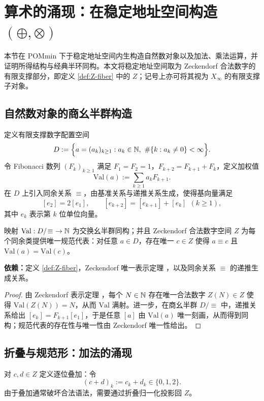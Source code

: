 \section{算术的涌现：在稳定地址空间构造 \texorpdfstring{$(\oplus,\otimes)$}{(oplus, otimes)}}\label{sec:emergent-arithmetic}

本节在 POMmin 下于稳定地址空间内生构造自然数对象以及加法、乘法运算，并证明所得结构与经典半环同构。本文将稳定地址空间取为 Zeckendorf 合法数字的有限支撑部分，即定义 \ref{def:Z-fiber} 中的 $Z$；记号上亦可将其视为 $X_\infty$ 的有限支撑子对象。

\subsection{自然数对象的商幺半群构造}
定义有限支撑数字配置空间
$$
D:=\Bigl\{a=(a_k)_{k\ge 1}: a_k\in\NN,\ \#\{k:a_k\neq 0\}<\infty\Bigr\}.
$$
令 Fibonacci 数列 $(F_k)_{k\ge 1}$ 满足 $F_1=F_2=1$，$F_{k+2}=F_{k+1}+F_k$，定义加权值
$$
\mathrm{Val}(a):=\sum_{k\ge 1} a_k F_{k+1}.
$$
在 $D$ 上引入同余关系 $\equiv$，由基准关系与递推关系生成，使得基向量满足
$$
[e_2]=2[e_1],\qquad [e_{k+2}]=[e_{k+1}]+[e_k]\ \ (k\ge 1),
$$
其中 $e_k$ 表示第 $k$ 位单位向量。

\begin{theorem}\label{thm:emergent-N}
映射 $\mathrm{Val}:D/\!\equiv\ \to \mathbb{N}$ 为交换幺半群同构；并且 Zeckendorf 合法数字空间 $Z$ 为每个同余类提供唯一规范代表：对任意 $a\in D$，存在唯一 $c\in Z$ 使得 $a\equiv c$ 且 $\mathrm{Val}(a)=\mathrm{Val}(c)$。
\par\noindent\textnormal{\textbf{依赖：}定义 \ref{def:Z-fiber}，Zeckendorf 唯一表示定理 \cite{Zeckendorf1972}，以及同余关系 $\equiv$ 的递推生成关系。}
\end{theorem}

\begin{proof}
由 Zeckendorf 表示定理 \cite{Zeckendorf1972}，每个 $N\in\mathbb{N}$ 存在唯一合法数字 $Z(N)\in Z$ 使得 $\mathrm{Val}(Z(N))=N$，从而 $\mathrm{Val}$ 满射。进一步，在商幺半群 $D/\!\equiv$ 中，递推关系给出 $[e_k]=F_{k+1}[e_1]$，于是任意 $[a]$ 由 $\mathrm{Val}(a)$ 唯一刻画，从而得到同构；规范代表的存在性与唯一性由 Zeckendorf 唯一性给出。
\end{proof}

\subsection{折叠与规范形：加法的涌现}
对 $c,d\in Z$ 定义逐位叠加：令
$$
(c+d)_k:=c_k+d_k\in\{0,1,2\}.
$$
由于叠加通常破坏合法语法，需要通过折叠归一化投影回 $Z$。


